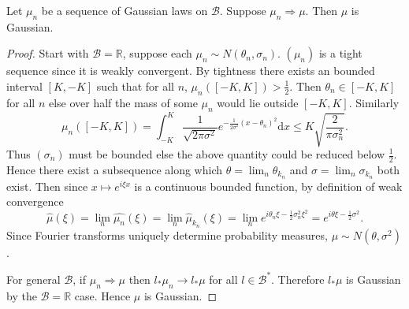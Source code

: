 \documentclass[fontsize=12pt, DIV=10]{scrreprt}
\theoremstyle{remark}
\newcommand{\R}{\mathbb R}
\newcommand{\calB}{\mathcal B}
\newcommand{\dif}[1]{\text{d} #1}
\newcommand{\towk}{\Rightarrow}
\begin{document}
\begin{prop}
	\label{prop:weak-convergence-gaussians}
	Let $\mu_n$ be a sequence of Gaussian laws on $\calB$. Suppose $\mu_n \towk \mu$. Then $\mu$ is Gaussian.
\end{prop}
\begin{proof}
	Start with $\calB = \R$, suppose each $\mu_n \sim N(\theta_n, \sigma_n)$. $(\mu_n)$ is a tight sequence since it is weakly convergent. By tightness there exists an bounded interval $[K, -K]$ such that for all $n$, $\mu_n([-K, K]) > \frac{1}{2}$. Then $\theta_n \in [-K, K]$ for all $n$ else over half the mass of some $\mu_n$ would lie outside $[-K, K]$. Similarly
	\begin{equation}
		\mu_n([-K, K]) = \int_{-K}^K \frac{1}{\sqrt{2 \pi \sigma^2}} e^{-\frac{1}{2\sigma^2}(x - \theta_n)^2} \dif x \leq K \sqrt{\frac{2}{\pi\sigma_n^2}}.
		\end{equation}
		Thus $(\sigma_n)$ must be bounded else the above quantity could be reduced below $\frac{1}{2}$. Hence there exist a subsequence along which $\theta = \lim_n \theta_{k_n}$ and $\sigma = \lim_n \sigma_{k_n}$ both exist. Then since $x \mapsto e^{i \xi x}$ is a continuous bounded function, by definition of weak convergence
	\begin{equation}
		\hat{\mu}(\xi) = \lim_n \hat{\mu_n}(\xi) = \lim_n \hat{\mu}_{k_n}(\xi) = \lim_n e^{i \theta_n \xi - \frac{1}{2} \sigma_n^2 \xi^2} = e^{i \theta \xi - \frac{1}{2} \sigma^2}.
	\end{equation}
	Since Fourier transforms uniquely determine probability measures, $\mu \sim N(\theta, \sigma^2)$.

	For general $\calB$, if $\mu_n \towk \mu$ then $l_* \mu_n \to l_* \mu$ for all $l \in \calB^*$. Therefore $l_* \mu$ is Gaussian by the $\calB = \R$ case. Hence $\mu$ is Gaussian.
\end{proof}

\printbibliography
\end{document}
